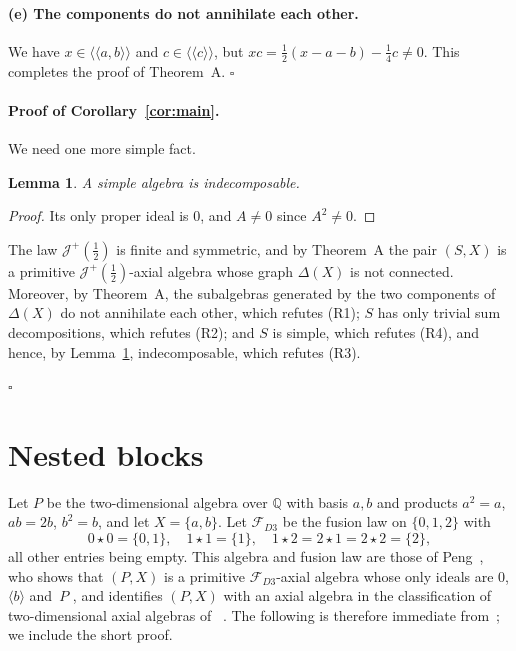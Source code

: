 \documentclass[11pt]{article}
\newif\ifwithC
\newtheorem{lemma}{Lemma}[section]
\theoremstyle{definition}
\theoremstyle{remark}
\newcommand{\Q}{\mathbb Q}
\newcommand{\cF}{\mathcal F}
\newcommand{\cJ}{\mathcal J}
\newcommand{\Jp}{\cJ^{+}}
\newcommand{\Jo}{\cJ^{\circ}}
\newcommand{\FD}{\cF_{D3}}
\newcommand{\lla}{\langle\!\langle}
\newcommand{\rra}{\rangle\!\rangle}
\newcommand{\half}{\tfrac12}
\begin{document}
\paragraph{(e) The components do not annihilate each other.}
We have $x\in\lla a,b\rra$ and $c\in\lla c\rra$, but
$xc=\half(x-a-b)-\frac14c\ne0$. This completes the proof of Theorem~A.
\hfill$\square$

\paragraph{Proof of Corollary~\ref{cor:main}.}
We need one more simple fact.

\begin{lemma}\label{lem:indec}
A simple algebra is indecomposable.
\end{lemma}

\begin{proof}
Its only proper ideal is $0$, and $A\ne0$ since $A^2\ne0$.
\end{proof}

The law $\Jp(\half)$ is finite and symmetric, and by Theorem~A the pair
$(S,X)$ is a primitive $\Jp(\half)$-axial algebra whose graph $\Delta(X)$ is
not connected. Moreover, by Theorem~A, the subalgebras generated by the two
components of $\Delta(X)$ do not annihilate each other, which refutes (R1);
$S$ has only trivial sum decompositions, which refutes (R2); and $S$ is
simple, which refutes (R4), and hence, by Lemma~\ref{lem:indec},
indecomposable, which refutes (R3).
\ifwithC
Statement (R5) is refuted by Theorem~C in Section~\ref{sec:block}, since
$\Jo(\half)$ is finite and symmetric.
\fi
\hfill$\square$

\section{Nested blocks}\label{sec:blocks}

Let $P$ be the two-dimensional algebra over $\Q$ with basis $a,b$ and
products $a^2=a$, $ab=2b$, $b^2=b$, and let $X=\{a,b\}$. Let $\FD$ be the
fusion law on $\{0,1,2\}$ with
\[
0\star0=\{0,1\},\quad 1\star1=\{1\},\quad 1\star2=2\star1=2\star2=\{2\},
\]
all other entries being empty. This algebra and fusion law are those of
Peng~\cite{peng}, who shows that $(P,X)$ is a primitive $\FD$-axial algebra
whose only ideals are $0$, $\langle b\rangle$ and~$P$ \cite[Thm~2.1]{peng},
and identifies $(P,X)$ with an axial algebra in the classification of
two-dimensional axial algebras of~\cite{kmp} \cite[Prop.~3.1]{peng}. The
following is therefore immediate from~\cite{peng}; we include the short
proof.
\end{document}
